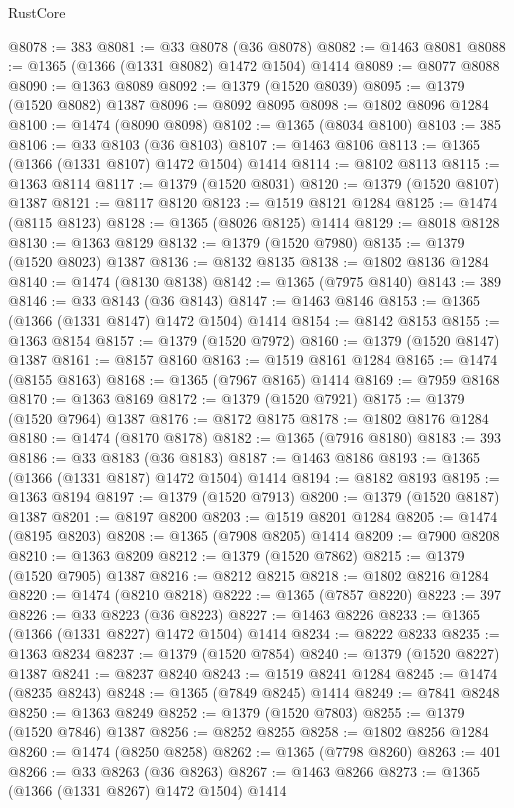 \begin{lexlean}{RustCore}
\begin{coremodule}
@8078 := 383
@8081 := @33 @8078 (@36 @8078)
@8082 := @1463 @8081
@8088 := @1365 (@1366 (@1331 @8082) @1472 @1504) @1414
@8089 := @8077 @8088
@8090 := @1363 @8089
@8092 := @1379 (@1520 @8039)
@8095 := @1379 (@1520 @8082) @1387
@8096 := @8092 @8095
@8098 := @1802 @8096 @1284
@8100 := @1474 (@8090 @8098)
@8102 := @1365 (@8034 @8100)
@8103 := 385
@8106 := @33 @8103 (@36 @8103)
@8107 := @1463 @8106
@8113 := @1365 (@1366 (@1331 @8107) @1472 @1504) @1414
@8114 := @8102 @8113
@8115 := @1363 @8114
@8117 := @1379 (@1520 @8031)
@8120 := @1379 (@1520 @8107) @1387
@8121 := @8117 @8120
@8123 := @1519 @8121 @1284
@8125 := @1474 (@8115 @8123)
@8128 := @1365 (@8026 @8125) @1414
@8129 := @8018 @8128
@8130 := @1363 @8129
@8132 := @1379 (@1520 @7980)
@8135 := @1379 (@1520 @8023) @1387
@8136 := @8132 @8135
@8138 := @1802 @8136 @1284
@8140 := @1474 (@8130 @8138)
@8142 := @1365 (@7975 @8140)
@8143 := 389
@8146 := @33 @8143 (@36 @8143)
@8147 := @1463 @8146
@8153 := @1365 (@1366 (@1331 @8147) @1472 @1504) @1414
@8154 := @8142 @8153
@8155 := @1363 @8154
@8157 := @1379 (@1520 @7972)
@8160 := @1379 (@1520 @8147) @1387
@8161 := @8157 @8160
@8163 := @1519 @8161 @1284
@8165 := @1474 (@8155 @8163)
@8168 := @1365 (@7967 @8165) @1414
@8169 := @7959 @8168
@8170 := @1363 @8169
@8172 := @1379 (@1520 @7921)
@8175 := @1379 (@1520 @7964) @1387
@8176 := @8172 @8175
@8178 := @1802 @8176 @1284
@8180 := @1474 (@8170 @8178)
@8182 := @1365 (@7916 @8180)
@8183 := 393
@8186 := @33 @8183 (@36 @8183)
@8187 := @1463 @8186
@8193 := @1365 (@1366 (@1331 @8187) @1472 @1504) @1414
@8194 := @8182 @8193
@8195 := @1363 @8194
@8197 := @1379 (@1520 @7913)
@8200 := @1379 (@1520 @8187) @1387
@8201 := @8197 @8200
@8203 := @1519 @8201 @1284
@8205 := @1474 (@8195 @8203)
@8208 := @1365 (@7908 @8205) @1414
@8209 := @7900 @8208
@8210 := @1363 @8209
@8212 := @1379 (@1520 @7862)
@8215 := @1379 (@1520 @7905) @1387
@8216 := @8212 @8215
@8218 := @1802 @8216 @1284
@8220 := @1474 (@8210 @8218)
@8222 := @1365 (@7857 @8220)
@8223 := 397
@8226 := @33 @8223 (@36 @8223)
@8227 := @1463 @8226
@8233 := @1365 (@1366 (@1331 @8227) @1472 @1504) @1414
@8234 := @8222 @8233
@8235 := @1363 @8234
@8237 := @1379 (@1520 @7854)
@8240 := @1379 (@1520 @8227) @1387
@8241 := @8237 @8240
@8243 := @1519 @8241 @1284
@8245 := @1474 (@8235 @8243)
@8248 := @1365 (@7849 @8245) @1414
@8249 := @7841 @8248
@8250 := @1363 @8249
@8252 := @1379 (@1520 @7803)
@8255 := @1379 (@1520 @7846) @1387
@8256 := @8252 @8255
@8258 := @1802 @8256 @1284
@8260 := @1474 (@8250 @8258)
@8262 := @1365 (@7798 @8260)
@8263 := 401
@8266 := @33 @8263 (@36 @8263)
@8267 := @1463 @8266
@8273 := @1365 (@1366 (@1331 @8267) @1472 @1504) @1414

\end{coremodule}
\end{lexlean}
